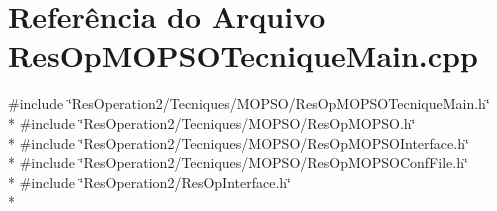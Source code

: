 \section{Referência do Arquivo Res\+Op\+M\+O\+P\+S\+O\+Tecnique\+Main.\+cpp}
\label{_2_tecniques_2_m_o_p_s_o_2_res_op_m_o_p_s_o_tecnique_main_8cpp}
{\ttfamily \#include \char`\"{}Res\+Operation2/\+Tecniques/\+M\+O\+P\+S\+O/\+Res\+Op\+M\+O\+P\+S\+O\+Tecnique\+Main.\+h\char`\"{}}\\*
{\ttfamily \#include \char`\"{}Res\+Operation2/\+Tecniques/\+M\+O\+P\+S\+O/\+Res\+Op\+M\+O\+P\+S\+O.\+h\char`\"{}}\\*
{\ttfamily \#include \char`\"{}Res\+Operation2/\+Tecniques/\+M\+O\+P\+S\+O/\+Res\+Op\+M\+O\+P\+S\+O\+Interface.\+h\char`\"{}}\\*
{\ttfamily \#include \char`\"{}Res\+Operation2/\+Tecniques/\+M\+O\+P\+S\+O/\+Res\+Op\+M\+O\+P\+S\+O\+Conf\+File.\+h\char`\"{}}\\*
{\ttfamily \#include \char`\"{}Res\+Operation2/\+Res\+Op\+Interface.\+h\char`\"{}}\\*
